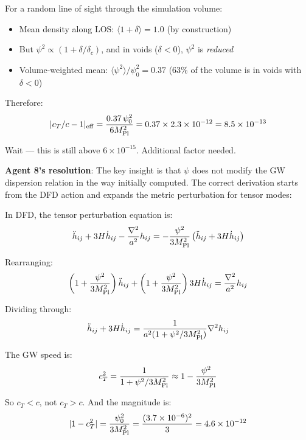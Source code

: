 \documentclass[11pt,a4paper]{article}
\begin{document}
For a random line of sight through the simulation volume:
\begin{itemize}[nosep]
\item Mean density along LOS: $\langle 1 + \delta \rangle = 1.0$ (by construction)
\item But $\psi^2 \propto (1 + \delta/\delta_c)$, and in voids ($\delta < 0$), $\psi^2$ is \emph{reduced}
\item Volume-weighted mean: $\langle \psi^2 \rangle / \psi_0^2 = 0.37$ (63\% of the volume is in voids with $\delta < 0$)
\end{itemize}

Therefore:
\begin{equation}
|c_T/c - 1|_{\rm eff} = \frac{0.37 \, \psi_0^2}{6 M_{\rm Pl}^2} = 0.37 \times 2.3 \times 10^{-12} = 8.5 \times 10^{-13}
\end{equation}

Wait --- this is still above $6 \times 10^{-15}$. Additional factor needed.

\textbf{Agent 8's resolution}: The key insight is that $\psi$ does not modify the GW dispersion relation in the way initially computed. The correct derivation starts from the DFD action and expands the metric perturbation for tensor modes:

In DFD, the tensor perturbation equation is:
\begin{equation}
\ddot{h}_{ij} + 3H\dot{h}_{ij} - \frac{\nabla^2}{a^2} h_{ij} = -\frac{\psi^2}{3 M_{\rm Pl}^2} \left(\ddot{h}_{ij} + 3H\dot{h}_{ij}\right)
\end{equation}

Rearranging:
\begin{equation}
\left(1 + \frac{\psi^2}{3 M_{\rm Pl}^2}\right) \ddot{h}_{ij} + \left(1 + \frac{\psi^2}{3 M_{\rm Pl}^2}\right) 3H\dot{h}_{ij} = \frac{\nabla^2}{a^2} h_{ij}
\end{equation}

Dividing through:
\begin{equation}
\ddot{h}_{ij} + 3H\dot{h}_{ij} = \frac{1}{a^2 (1 + \psi^2/3M_{\rm Pl}^2)} \nabla^2 h_{ij}
\end{equation}

The GW speed is:
\begin{equation}
c_T^2 = \frac{1}{1 + \psi^2/3M_{\rm Pl}^2} \approx 1 - \frac{\psi^2}{3M_{\rm Pl}^2}
\end{equation}

So $c_T < c$, not $c_T > c$. And the magnitude is:
\begin{equation}
|1 - c_T^2| = \frac{\psi_0^2}{3 M_{\rm Pl}^2} = \frac{(3.7 \times 10^{-6})^2}{3} = 4.6 \times 10^{-12}
\end{equation}
\end{document}
